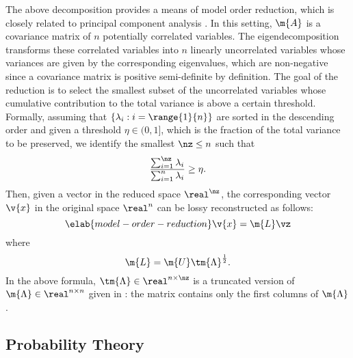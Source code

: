 The above decomposition provides a means of model order reduction, which is
closely related to principal component analysis \cite{hastie2013}. In this
setting, $\m{A}$ is a covariance matrix of $n$ potentially correlated variables.
The eigendecomposition transforms these correlated variables into $n$ linearly
uncorrelated variables whose variances are given by the corresponding
eigenvalues, which are non-negative since a covariance matrix is positive
semi-definite by definition. The goal of the reduction is to select the smallest
subset of the uncorrelated variables whose cumulative contribution to the total
variance is above a certain threshold. Formally, assuming that $\{ \lambda_i: i
= \range{1}{n} \}$ are sorted in the descending order and given a threshold
$\eta \in (0, 1]$, which is the fraction of the total variance to be preserved,
we identify the smallest $\nz \leq n$ such that
\[
  \frac{\sum_{i = 1}^\nz \lambda_i}{\sum_{i = 1}^n \lambda_i} \geq \eta.
\]
Then, given a vector \vz in the reduced space $\real^\nz$, the corresponding
vector $\v{x}$ in the original space $\real^n$ can be lossy reconstructed as
follows:
\begin{equation} \elab{model-order-reduction}
  \v{x} = \m{L} \vz
\end{equation}
where
\[
  \m{L} = \m{U} \tm{\Lambda}^\frac{1}{2}.
\]
In the above formula, $\tm{\Lambda} \in \real^{n \times \nz}$ is a truncated
version of $\m{\Lambda} \in \real^{n \times n}$ given in
: the matrix contains only the first \nz columns of
$\m{\Lambda}$.

\subsection{Probability Theory}

